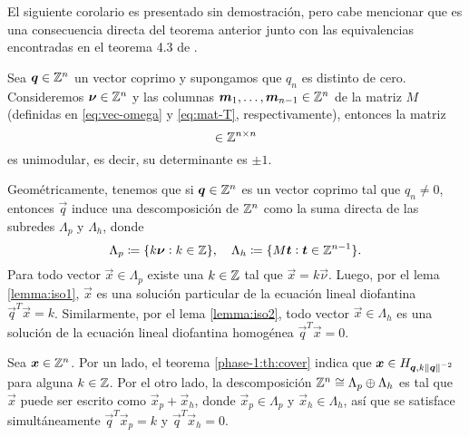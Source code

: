 El siguiente corolario es presentado sin demostración, pero cabe mencionar que es una consecuencia
directa del teorema anterior junto con las equivalencias encontradas en el teorema 4.3 de \cite{alex}.
\begin{corollary}
	\label{cor:unimodular}
	Sea $\boldsymbol{q} \in \mathbb{Z}^n$ un vector coprimo y supongamos que $q_n$ es distinto de cero.
	Consideremos $\boldsymbol{\nu} \in \mathbb{Z}^n$ y las columnas $\boldsymbol{m}_1, \ldots, \boldsymbol{m}_{n-1} \in \mathbb{Z}^n$ de
	la matriz $M$ (definidas en \eqref{eq:vec-omega} y \eqref{eq:mat-T}, respectivamente), entonces
	la matriz
	\begin{equation*}
		[ \vec{\nu} \mid \vec{m}_1 \mid \cdots \mid \vec{m}_{n-1} ] \in \Z^{n \times n}
	\end{equation*}
	es unimodular, es decir, su determinante es $\pm 1$.
\end{corollary}


Geométricamente, tenemos que si $\boldsymbol{q} \in \mathbb{Z}^n$ es un vector coprimo tal que $q_n \neq 0$,
entonces $\vec{q}$ induce una descomposición de $\mathbb{Z}^n$ como la suma directa de las subredes
$\Lambda_p$ y $\Lambda_h$, donde
\begin{equation}
	\label{eq:dec}
	\Lambda_p \coloneq \lbrace k\boldsymbol{\nu} \vcentcolon k \in \mathbb{Z} \rbrace, \quad
	\Lambda_h \coloneq \lbrace M\boldsymbol{t} \vcentcolon \boldsymbol{t} \in \mathbb{Z}^{n-1} \rbrace.
\end{equation}
Para todo vector $\vec{x} \in \Lambda_p$ existe una $k \in \mathbb{Z}$ tal que $\vec{x} =
k\vec{\nu}$. Luego, por el lema \ref{lemma:iso1}, $\vec{x}$ es una solución particular de la
ecuación lineal diofantina $\vec{q}^T\vec{x} = k$. Similarmente, por el lema \ref{lemma:iso2}, todo
vector $\vec{x} \in \Lambda_h$ es una solución de la ecuación lineal diofantina homogénea
$\vec{q}^T\vec{x} = 0$.

Sea $\boldsymbol{x} \in \mathbb{Z}^n$. Por un lado, el teorema \ref{phase-1:th:cover} indica que $\boldsymbol{x} \in
H_{\boldsymbol{q}, k\left\lVert \boldsymbol{q} \right\rVert^{-2}}$ para alguna $k \in \mathbb{Z}$. Por el otro lado, la descomposición $\mathbb{Z}^n \cong \Lambda_p
\oplus \Lambda_h$ es tal que $\vec{x}$ puede ser escrito como $\vec{x}_p + \vec{x}_h$,
donde $\vec{x}_p \in \Lambda_p$ y $\vec{x}_h \in \Lambda_h$, así que se satisface simultáneamente
$\vec{q}^T\vec{x}_p = k$ y $\vec{q}^T\vec{x}_h = 0$.

